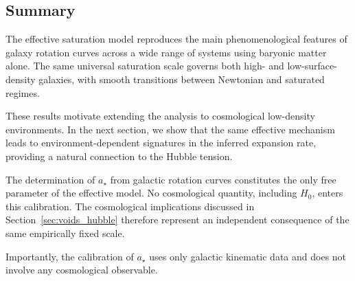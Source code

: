 \subsection{Summary}
  \label{subsec:rc_summary}

  The effective saturation model reproduces the main phenomenological features
  of galaxy rotation curves across a wide range of systems using baryonic matter alone.
  The same universal saturation scale governs both high- and
  low-surface-density galaxies, with smooth transitions between Newtonian and saturated regimes.

  These results motivate extending the analysis to cosmological low-density environments.
  In the next section, we show that the same effective mechanism leads to
  environment-dependent signatures in the inferred expansion rate, providing a
  natural connection to the Hubble tension.

  The determination of $a_\star$ from galactic rotation curves
  constitutes the only free parameter of the effective model.
  No cosmological quantity, including $H_0$, enters this calibration.
  The cosmological implications discussed in
  Section~\ref{sec:voids_hubble} therefore represent an independent
  consequence of the same empirically fixed scale.

  Importantly, the calibration of $a_\star$ uses only galactic kinematic data and does not involve any
  cosmological observable.
